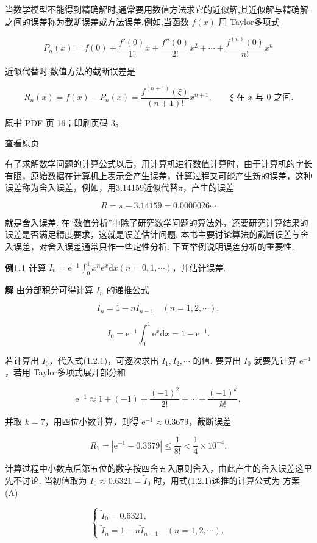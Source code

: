 当数学模型不能得到精确解时,通常要用数值方法求它的近似解,其近似解与精确解之间的误差称为截断误差或方法误差.例如,当函数 \(f(x)\) 用 Taylor多项式

\[
P_n(x)=f(0)+\frac{f'(0)}{1!}x+\frac{f''(0)}{2!}x^2+\cdots+\frac{f^{(n)}(0)}{n!}x^n
\]

近似代替时,数值方法的截断误差是

\[
R_n(x)=f(x)-P_n(x)=\frac{f^{(n+1)}(\xi)}{(n+1)!}x^{n+1},\qquad \xi\text{ 在 }x\text{ 与 }0\text{ 之间}.
\]

\clearpage

原书 PDF 页 16；印刷页码 3。

\href{source-images/pdf-016.jpeg}{查看原页}

有了求解数学问题的计算公式以后，用计算机进行数值计算时，由于计算机的字长有限，原始数据在计算机上表示会产生误差，计算过程又可能产生新的误差，这种误差称为舍入误差，例如，用3.14159近似代替\(\pi\)，产生的误差

\[
R = \pi - 3.14159 = 0.0000026\cdots
\]

就是舍入误差. 在``数值分析''中除了研究数学问题的算法外，还要研究计算结果的误差是否满足精度要求，这就是误差估计问题. 本书主要讨论算法的截断误差与舍入误差，对舍入误差通常只作一些定性分析. 下面举例说明误差分析的重要性.

\textbf{例1.1} 计算 \(I_n = \mathrm{e}^{-1} \int_{0}^{1} x^n \mathrm{e}^{x} \mathrm{d}x (n = 0,1,\cdots)\)，并估计误差.

\textbf{解} 由分部积分可得计算 \(I_n\) 的递推公式

\[
I_n = 1 - n I_{n-1} \quad (n = 1,2,\cdots), \tag{1.2.1}
\]

\[
I_0 = \mathrm{e}^{-1} \int_{0}^{1} \mathrm{e}^{x} \mathrm{d}x = 1 - \mathrm{e}^{-1}.
\]

若计算出 \(I_0\)，代入式(1.2.1)，可逐次求出 \(I_1, I_2, \cdots\) 的值. 要算出 \(I_0\) 就要先计算 \(\mathrm{e}^{-1}\)，若用 Taylor多项式展开部分和

\[
\mathrm{e}^{-1} \approx 1 + (-1) + \frac{(-1)^2}{2!} + \cdots + \frac{(-1)^k}{k!},
\]

并取 \(k=7\)，用四位小数计算，则得 \(\mathrm{e}^{-1} \approx 0.3679\)，截断误差

\[
R_7 = |\mathrm{e}^{-1} - 0.3679| \leqslant \frac{1}{8!} < \frac{1}{4} \times 10^{-4}.
\]

计算过程中小数点后第五位的数字按四舍五入原则舍入，由此产生的舍入误差这里先不讨论. 当初值取为 \(I_0 \approx 0.6321 = \tilde{I}_0\) 时，用式(1.2.1)递推的计算公式为 方案(A)

\[
\begin{cases}
\tilde{I}_0 = 0.6321, \\
\tilde{I}_n = 1 - n \tilde{I}_{n-1} \quad (n = 1,2,\cdots).
\end{cases}
\]

